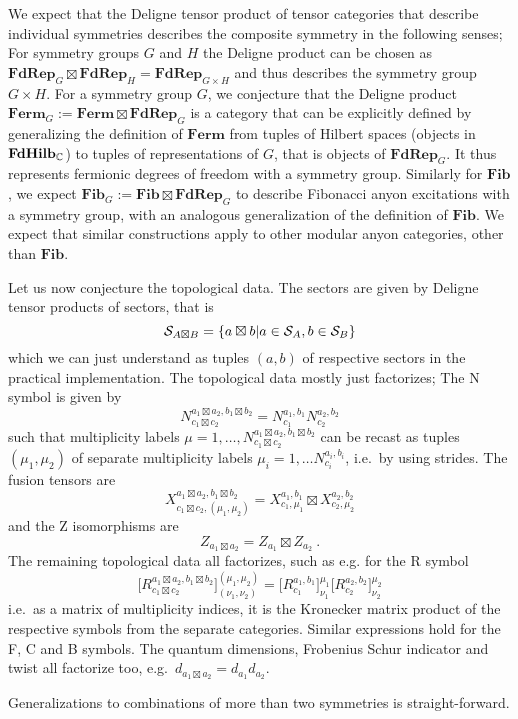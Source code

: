 We expect that the Deligne tensor product of tensor categories that describe individual symmetries describes the composite symmetry in the following senses;
%
For symmetry groups $G$ and $H$ the Deligne product can be chosen as $\mathbf{FdRep}_{G} \boxtimes \mathbf{FdRep}_{H} = \mathbf{FdRep}_{G\times H}$ and thus describes the symmetry group $G \times H$.
%
For a symmetry group $G$, we conjecture that the Deligne product $\mathbf{Ferm}_G := \mathbf{Ferm} \boxtimes \mathbf{FdRep}_{G}$ is a category that can be explicitly defined by generalizing the definition of $\mathbf{Ferm}$ from tuples of Hilbert spaces (objects in $\mathbf{FdHilb}_{\mathbb{C}}$) to tuples of representations of $G$, that is objects of $\mathbf{FdRep}_{G}$.
%
It thus represents fermionic degrees of freedom with a symmetry group.
%
Similarly for $\mathbf{Fib}$, we expect $\mathbf{Fib}_G := \mathbf{Fib} \boxtimes \mathbf{FdRep}_{G}$ to describe Fibonacci anyon excitations with a symmetry group, with an analogous generalization of the definition of $\mathbf{Fib}$.
%
We expect that similar constructions apply to other modular anyon categories, other than $\mathbf{Fib}$.

Let us now conjecture the topological data.
%
The sectors are given by Deligne tensor products of sectors, that is 
\begin{equation}
    \mathcal{S}_{A \boxtimes B} = \setdef{a \boxtimes b}{a\in\mathcal{S}_A, b\in\mathcal{S}_B}
\end{equation}
which we can just understand as tuples $(a,b)$ of respective sectors in the practical implementation.
%
The topological data mostly just factorizes;
%
The N symbol is given by 
\begin{equation}
    N^{a_1 \boxtimes a_2, b_1 \boxtimes b_2}_{c_1\boxtimes c_2} = N^{a_1,b_1}_{c_1} N^{a_2,b_2}_{c_2}
\end{equation}
such that multiplicity labels $\mu = 1, \dots, N^{a_1 \boxtimes a_2, b_1 \boxtimes b_2}_{c_1\boxtimes c_2}$ can be recast as tuples $(\mu_1, \mu_2)$ of separate multiplicity labels $\mu_i = 1,\dots N^{a_i,b_i}_{c_i}$, i.e.~by using strides.
%
The fusion tensors are
\begin{equation}
    X^{a_1 \boxtimes a_2, b_1 \boxtimes b_2}_{c_1\boxtimes c_2,(\mu_1,\mu_2)}
    = X^{a_1,b_1}_{c_1,\mu_1} \boxtimes X^{a_2,b_2}_{c_2,\mu_2}
\end{equation}
and the Z isomorphisms are
\begin{equation}
    Z_{a_1 \boxtimes a_2} = Z_{a_1} \boxtimes Z_{a_2}
    ~.
\end{equation}
%
The remaining topological data all factorizes, such as e.g. for the R symbol
\begin{equation}
    \big[ R^{a_1 \boxtimes a_2, b_1 \boxtimes b_2}_{c_1\boxtimes c_2} \big]^{(\mu_1, \mu_2)}_{(\nu_1, \nu_2)}
    = \big[ R^{a_1,b_1}_{c_1} \big]^{\mu_1}_{\nu_1} \big[ R^{a_2,b_2}_{c_2} \big]^{\mu_2}_{\nu_2} 
\end{equation}
i.e.~as a matrix of multiplicity indices, it is the Kronecker matrix product of the respective symbols from the separate categories.
%
Similar expressions hold for the F, C and B symbols.
%
The quantum dimensions, Frobenius Schur indicator and twist all factorize too, e.g.~$d_{a_1\boxtimes a_2} = d_{a_1} d_{a_2}$.

Generalizations to combinations of more than two symmetries is straight-forward.